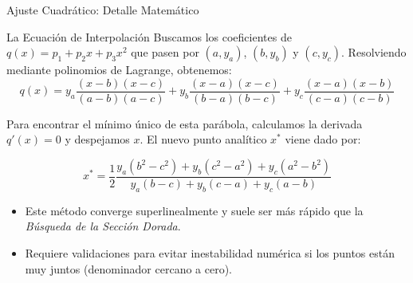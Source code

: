 \begin{frame}{Ajuste Cuadrático: Detalle Matemático}
    \begin{alertblock}{La Ecuación de Interpolación}
        \scriptsize
        Buscamos los coeficientes de $q(x) = p_1 + p_2x + p_3x^2$ que pasen por $(a, y_a)$, $(b, y_b)$ y $(c, y_c)$. 
        Resolviendo mediante polinomios de Lagrange, obtenemos:
        \begin{equation*}
            q(x) = y_a\frac{(x-b)(x-c)}{(a-b)(a-c)} + y_b\frac{(x-a)(x-c)}{(b-a)(b-c)} + y_c\frac{(x-a)(x-b)}{(c-a)(c-b)}
        \end{equation*}
    \end{alertblock}

    \vspace{0.5em}
    \footnotesize
    Para encontrar el mínimo único de esta parábola, calculamos la derivada $q'(x) = 0$ y despejamos $x$. El nuevo punto analítico $x^*$ viene dado por:
    
    \begin{equation*}
        x^* = \frac{1}{2} \frac{y_a(b^2-c^2) + y_b(c^2-a^2) + y_c(a^2-b^2)}{y_a(b-c) + y_b(c-a) + y_c(a-b)}
    \end{equation*}

    \scriptsize
    \begin{itemize}
        \item Este método converge superlinealmente y suele ser más rápido que la \textit{Búsqueda de la Sección Dorada}.
        \item Requiere validaciones para evitar inestabilidad numérica si los puntos están muy juntos (denominador cercano a cero).
    \end{itemize}
\end{frame}

